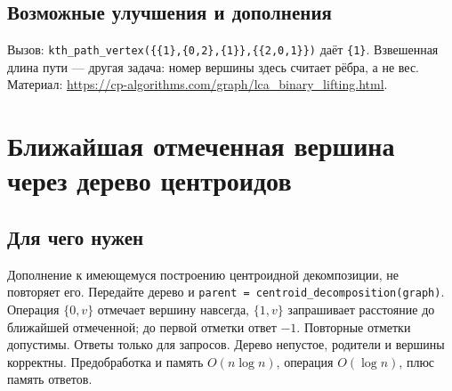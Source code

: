 \subsection*{Возможные улучшения и дополнения}
Вызов: \texttt{kth\_path\_vertex(\{\{1\},\{0,2\},\{1\}\},\{\{2,0,1\}\})}
даёт \texttt{\{1\}}. Взвешенная длина пути --- другая задача:
номер вершины здесь считает рёбра, а не вес.
Материал: \url{https://cp-algorithms.com/graph/lca_binary_lifting.html}.

\clearpage

\fi
\iffalse
\section{Ближайшая отмеченная вершина через дерево центроидов}
\subsection*{Для чего нужен}
Дополнение к имеющемуся построению центроидной декомпозиции, не повторяет его.
Передайте дерево и \texttt{parent = centroid\_decomposition(graph)}.
Операция $\{0,v\}$ отмечает вершину навсегда, $\{1,v\}$ запрашивает
расстояние до ближайшей отмеченной; до первой отметки ответ $-1$.
Повторные отметки допустимы. Ответы только для запросов.
Дерево непустое, родители и вершины корректны.
Предобработка и память $O(n\log n)$, операция $O(\log n)$, плюс память ответов.
